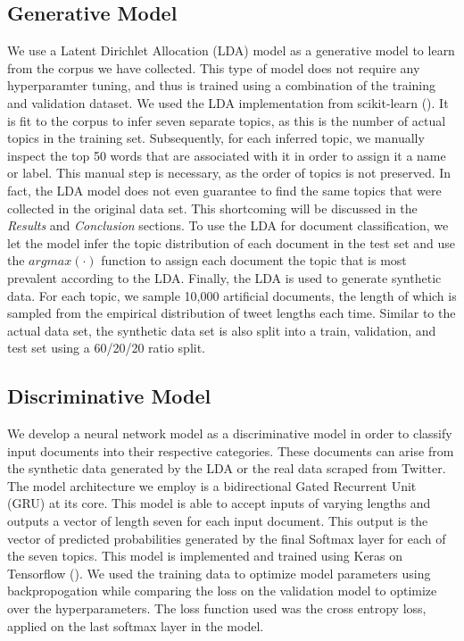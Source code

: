 \documentclass[11pt]{article}
\begin{document}
\subsection{Generative Model}
We use a Latent Dirichlet Allocation (LDA) model as a generative model to learn from the corpus we have collected. This type of model does not require any hyperparamter tuning, and thus is trained using a combination of the training and validation dataset. We used the LDA implementation from scikit-learn (\cite{sklearn}). It is fit to the corpus to infer seven separate topics, as this is the number of actual topics in the training set. Subsequently, for each inferred topic, we manually inspect the top 50 words that are associated with it in order to assign it a name or label. This manual step is necessary, as the order of topics is not preserved. In fact, the LDA model does not even guarantee to find the same topics that were collected in the original data set. This shortcoming will be discussed in the \emph{Results} and \emph{Conclusion} sections. 
To use the LDA for document classification,  we let the model infer the topic distribution of each document in the test set and use the $argmax(\cdot)$ function to assign each document the topic that is most prevalent according to the LDA.
Finally, the LDA is used to generate synthetic data. For each topic, we sample 10,000 artificial documents, the length of which is sampled from the empirical distribution of tweet lengths each time. Similar to the actual data set, the synthetic data set is also split into a train, validation, and test set using a 60/20/20 ratio split.


\subsection{Discriminative Model}
We develop a neural network model as a discriminative model in order to classify input documents into their respective categories. These documents can arise from the synthetic data generated by the LDA or the real data scraped from Twitter. The model architecture we employ is a bidirectional Gated Recurrent Unit (GRU) at its core. This model is able to accept inputs of varying lengths and outputs a vector of length seven for each input document. This output is the vector of predicted probabilities generated by the final Softmax layer for each of the seven topics. This model is implemented and trained using Keras on Tensorflow (\cite{tensorflow}). We used the training data to optimize model parameters using backpropogation while comparing the loss on the validation model to optimize over the hyperparameters. The loss function used was the cross entropy loss, applied on the last softmax layer in the model.   
\end{document}

